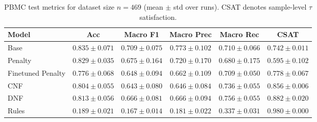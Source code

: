 \documentclass{article}
\theoremstyle{plain}
\theoremstyle{definition}
\theoremstyle{remark}
\begin{document}
\begin{table}[h]
\centering
\small
\begin{tabular}{lccccc}
\toprule
Model & Acc & Macro F1 & Macro Prec & Macro Rec & CSAT \\
\midrule
Base                         & $0.835 \pm 0.071$ & $0.709 \pm 0.075$ & $0.773 \pm 0.102$ & $0.710 \pm 0.066$ & $0.742 \pm 0.011$ \\
Penalty            & $0.829 \pm 0.035$ & $0.675 \pm 0.164$ & $0.720 \pm 0.170$ & $0.680 \pm 0.175$ & $0.595 \pm 0.102$ \\
Finetuned Penalty   & $0.776 \pm 0.068$ & $0.648 \pm 0.094$ & $0.662 \pm 0.109$ & $0.709 \pm 0.050$ & $0.778 \pm 0.067$ \\
CNF                & $0.804 \pm 0.055$ & $0.643 \pm 0.080$ & $0.646 \pm 0.084$ & $0.736 \pm 0.055$ & $0.856 \pm 0.006$ \\
DNF                & $0.813 \pm 0.056$ & $0.666 \pm 0.081$ & $0.666 \pm 0.094$ & $0.756 \pm 0.055$ & $0.882 \pm 0.020$ \\
Rules               & $0.189 \pm 0.021$ & $0.167 \pm 0.014$ & $0.181 \pm 0.022$ & $0.337 \pm 0.031$ & $0.980 \pm 0.000$ \\
\bottomrule
\end{tabular}
\caption{PBMC test metrics for dataset size $n=469$ (mean $\pm$ std over runs). CSAT denotes sample-level $\tau$ satisfaction.}
\label{tab:pbmc_test_n469}
\end{table}












\end{document}
